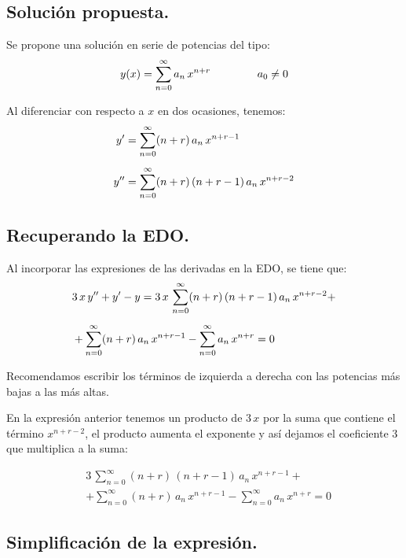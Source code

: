 \subsection*{Solución propuesta.}

Se propone una solución en serie de potencias del tipo:
\begin{align*}
y(x) = \sum_{n=0}^{\infty} a_{n} \, x^{n+r} \hspace{1.5cm} a_{0} \neq 0
\end{align*}

Al diferenciar con respecto a $x$ en dos ocasiones, tenemos:
\begin{align*}
{y}^{\prime} &= \sum_{n=0}^{\infty} (n + r) \, a_{n} \, x^{n+r-1} \\[0.5em] 
{y}^{\prime \prime} &= \sum_{n=0}^{\infty} (n + r) \, (n + r - 1) \, a_{n} \, x^{n+r-2}
\end{align*}

\subsection*{Recuperando la EDO.}

Al incorporar las expresiones de las derivadas en la EDO, se tiene que:
\begin{align*}
&3 \, x \, {y}^{\prime \prime} + {y}^{\prime} - y = 3 \, x \, \sum_{n=0}^{\infty} (n + r) \, (n + r - 1) \, a_{n} \, x^{n+r-2} + \\[0.5em]
&+ \sum_{n=0}^{\infty} (n + r) \, a_{n} \, x^{n+r-1} - \sum_{n=0}^{\infty} a_{n} \, x^{n+r} = 0
\end{align*}

Recomendamos escribir los términos de izquierda a derecha con las potencias más bajas a las más altas.
\par
En la expresión anterior tenemos un producto de $3 \, x$ por la suma que contiene el término $x^{n+r-2}$, el producto aumenta el exponente y así dejamos el coeficiente $3$ que multiplica a la suma:

\begin{align*}
&3 \, \sum_{n=0}^{\infty} (n + r) \, (n + r - 1) \, a_{n} \, x^{n+r-1} + \\[0.5em]
&+ \sum_{n=0}^{\infty} (n + r) \, a_{n} \, x^{n+r-1} - \sum_{n=0}^{\infty} a_{n} \, x^{n+r} = 0
\end{align*}    


\subsection*{Simplificación de la expresión.}

